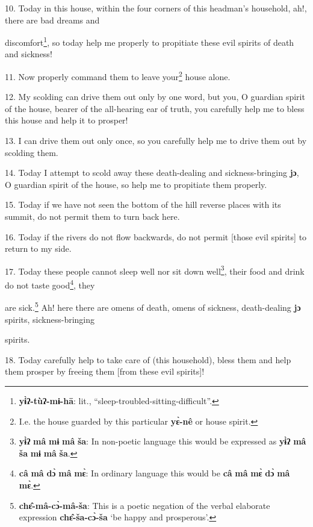 10. Today in this house, within the four corners of this headman's household, ah!,
there are bad dreams and

discomfort\footnote{\textbf{yɨ̀ʔ-tùʔ-mɨ-hā}: lit., ``sleep-troubled-sitting-difficult''.}, so today help me properly to propitiate these evil spirits of death
and sickness!

11. Now properly command them to leave your\footnote{I.e. the house guarded by this particular \textbf{yɛ̀-nê} or house spirit.} house alone.

12. My scolding can drive them out only by one word, but you, O guardian spirit
of the house, bearer of the all-hearing ear of truth, you carefully help me to
bless this house and help it to prosper!

13. I can drive them out only once, so you carefully help me to drive them out
by scolding them.

14. Today I attempt to scold away these death-dealing and\textbf{ }sickness-bringing\textbf{
jɔ}, O guardian spirit of the house, so help me to propitiate them properly.

15. Today if we have not seen the bottom of the hill reverse places with its summit,
do not permit them to turn back here.

16. Today if the rivers do not flow backwards, do not permit [those evil spirits]
to return to my side.

17. Today these people cannot sleep well nor sit down well\footnote{\textbf{yɨ̀ʔ} \textbf{mâ} \textbf{mɨ} \textbf{mâ} \textbf{ša}: In non-poetic language this would be expressed as \textbf{yɨ̀ʔ} \textbf{mâ} \textbf{ša} \textbf{mɨ} \textbf{mâ} \textbf{ša}.}, their food and
drink do not taste good\footnote{\textbf{câ} \textbf{mâ} \textbf{dɔ̀} \textbf{mâ} \textbf{mɛ̀}: In ordinary language this would be \textbf{câ} \textbf{mâ} \textbf{mɛ̀} \textbf{dɔ̀} \textbf{mâ} \textbf{mɛ̀}.}, they

are sick.\footnote{\textbf{chɛ̂-mâ-cɔ̀-mâ-ša}: This is a poetic negation of the verbal elaborate expression \textbf{chɛ̂-ša-cɔ̀-ša} `be happy and prosperous'.} Ah! here there are omens of death, omens of sickness, death-dealing
\textbf{jɔ} spirits, sickness-bringing

spirits.

18. Today carefully help to take care of (this household), bless them and help them
prosper by freeing them [from these evil spirits]!

